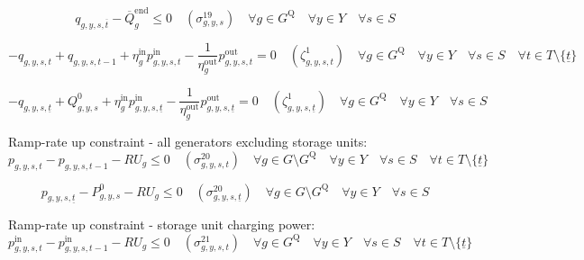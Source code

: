 \documentclass{article}
\newcommand{\sGenerators}{G}
\newcommand{\sStorage}{G^{\mathrm{Q}}}
\newcommand{\sYears}{Y}
\newcommand{\sScenarios}{S}
\newcommand{\sIntervals}{T}
\newcommand{\iGenerator}{g}
\newcommand{\iYear}{y}
\newcommand{\iScenario}{s}
\newcommand{\iInterval}{t}
\newcommand{\iIntervalTerminal}{\overline{\iInterval}}
\newcommand{\iIntervalStart}{\underline{\iInterval}}
\newcommand{\cRampRateUp}[1][\iGenerator]{RU_{#1}}
\newcommand{\cStorageUnitEnergyIntervalEndMax}[1][\iGenerator]{\overline{Q}^{\mathrm{end}}_{#1}}
\newcommand{\cStorageUnitEfficiencyCharging}{\eta_{\iGenerator}^{\mathrm{in}}}
\newcommand{\cStorageUnitEfficiencyDischarging}{\eta_{\iGenerator}^{\mathrm{out}}}
\newcommand{\cPowerInitial}[1][\iGenerator,\iYear,\iScenario]{P_{#1}^{0}}
\newcommand{\cStorageEnergyInitial}[1][\iGenerator,\iYear,\iScenario]{Q_{#1}^{0}}
\newcommand{\vPower}[1][\iGenerator,\iYear,\iScenario,\iInterval]{p_{#1}}
\newcommand{\vPowerIn}[1][\iGenerator,\iYear,\iScenario,\iInterval]{p^{\mathrm{in}}_{#1}}
\newcommand{\vPowerOut}[1][\iGenerator,\iYear,\iScenario,\iInterval]{p^{\mathrm{out}}_{#1}}
\newcommand{\vStorageUnitEnergy}[1][\iGenerator,\iYear,\iScenario,\iInterval]{q_{#1}}
\newcommand{\dMaxStorageEnergyIntervalEnd}[1][\iGenerator,\iYear,\iScenario]{\sigma_{#1}^{19}}
\newcommand{\dRampRateUp}[1][\iGenerator,\iYear,\iScenario,\iInterval]{\sigma_{#1}^{20}}
\newcommand{\dRampRateUpStorageCharging}[1][\iGenerator,\iYear,\iScenario,\iInterval]{\sigma_{#1}^{21}}
\newcommand{\dStorageEnergyTransition}[1][\iGenerator,\iYear,\iScenario,\iInterval]{\zeta_{#1}^{1}}
\newcommand{\sScenarioSets}{\quad \forall \iYear \in \sYears \quad \forall \iScenario \in \sScenarios \quad \forall \iInterval \in \sIntervals}
\begin{document}
\begin{equation}
	\vStorageUnitEnergy[\iGenerator,\iYear,\iScenario,\iIntervalTerminal] - \cStorageUnitEnergyIntervalEndMax \leq  0 \quad (\dMaxStorageEnergyIntervalEnd) \quad \forall \iGenerator \in \sStorage \quad \forall \iYear \in \sYears \quad \forall \iScenario \in \sScenarios
\end{equation}

\begin{equation}
	- \vStorageUnitEnergy + \vStorageUnitEnergy[\iGenerator,\iYear,\iScenario,\iInterval-1] + \cStorageUnitEfficiencyCharging \vPowerIn - \frac{1}{\cStorageUnitEfficiencyDischarging} \vPowerOut = 0 \quad (\dStorageEnergyTransition) \quad \forall \iGenerator \in \sStorage \sScenarioSets \setminus \{\iIntervalStart\}
\end{equation}

\begin{equation}
	- \vStorageUnitEnergy[\iGenerator,\iYear,\iScenario,\iIntervalStart] + \cStorageEnergyInitial + \cStorageUnitEfficiencyCharging \vPowerIn[\iGenerator,\iYear,\iScenario,\iIntervalStart] - \frac{1}{\cStorageUnitEfficiencyDischarging} \vPowerOut[\iGenerator,\iYear,\iScenario,\iIntervalStart] = 0 \quad (\dStorageEnergyTransition[\iGenerator,\iYear,\iScenario,\iIntervalStart]) \quad \forall \iGenerator \in \sStorage \quad \forall \iYear \in \sYears \quad \forall \iScenario \in \sScenarios
\end{equation}

Ramp-rate up constraint - all generators excluding storage units:
\begin{equation}
	\vPower - \vPower[\iGenerator,\iYear,\iScenario,\iInterval-1] - \cRampRateUp \leq 0 \quad (\dRampRateUp) \quad \forall \iGenerator \in \sGenerators \setminus \sStorage \quad \forall \iYear \in \sYears \quad \forall \iScenario \in \sScenarios \quad \forall \iInterval \in \sIntervals \setminus \{\iIntervalStart\}
\end{equation}

\begin{equation}
	\vPower[\iGenerator,\iYear,\iScenario,\iIntervalStart] - \cPowerInitial - \cRampRateUp \leq 0 \quad (\dRampRateUp[\iGenerator,\iYear,\iScenario,\iIntervalStart]) \quad \forall \iGenerator \in \sGenerators \setminus \sStorage \quad \forall \iYear \in \sYears \quad \forall \iScenario \in \sScenarios
\end{equation}


Ramp-rate up constraint - storage unit charging power:
\begin{equation}
\vPowerIn - \vPowerIn[\iGenerator,\iYear,\iScenario,\iInterval-1] - \cRampRateUp \leq 0 \quad (\dRampRateUpStorageCharging) \quad \forall \iGenerator \in \sStorage \quad \forall \iYear \in \sYears \quad \forall \iScenario \in \sScenarios \quad \forall \iInterval \in \sIntervals \setminus \{\iIntervalStart\}
\end{equation}
\end{document}

